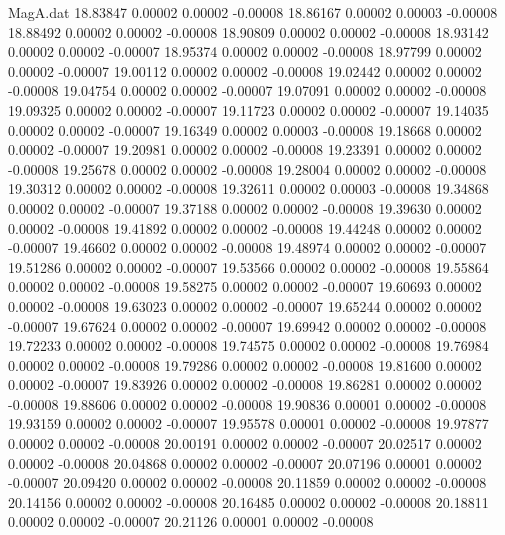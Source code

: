 \begin{filecontents}{MagA.dat}
  18.83847    0.00002    0.00002   -0.00008
  18.86167    0.00002    0.00003   -0.00008
  18.88492    0.00002    0.00002   -0.00008
  18.90809    0.00002    0.00002   -0.00008
  18.93142    0.00002    0.00002   -0.00007
  18.95374    0.00002    0.00002   -0.00008
  18.97799    0.00002    0.00002   -0.00007
  19.00112    0.00002    0.00002   -0.00008
  19.02442    0.00002    0.00002   -0.00008
  19.04754    0.00002    0.00002   -0.00007
  19.07091    0.00002    0.00002   -0.00008
  19.09325    0.00002    0.00002   -0.00007
  19.11723    0.00002    0.00002   -0.00007
  19.14035    0.00002    0.00002   -0.00007
  19.16349    0.00002    0.00003   -0.00008
  19.18668    0.00002    0.00002   -0.00007
  19.20981    0.00002    0.00002   -0.00008
  19.23391    0.00002    0.00002   -0.00008
  19.25678    0.00002    0.00002   -0.00008
  19.28004    0.00002    0.00002   -0.00008
  19.30312    0.00002    0.00002   -0.00008
  19.32611    0.00002    0.00003   -0.00008
  19.34868    0.00002    0.00002   -0.00007
  19.37188    0.00002    0.00002   -0.00008
  19.39630    0.00002    0.00002   -0.00008
  19.41892    0.00002    0.00002   -0.00008
  19.44248    0.00002    0.00002   -0.00007
  19.46602    0.00002    0.00002   -0.00008
  19.48974    0.00002    0.00002   -0.00007
  19.51286    0.00002    0.00002   -0.00007
  19.53566    0.00002    0.00002   -0.00008
  19.55864    0.00002    0.00002   -0.00008
  19.58275    0.00002    0.00002   -0.00007
  19.60693    0.00002    0.00002   -0.00008
  19.63023    0.00002    0.00002   -0.00007
  19.65244    0.00002    0.00002   -0.00007
  19.67624    0.00002    0.00002   -0.00007
  19.69942    0.00002    0.00002   -0.00008
  19.72233    0.00002    0.00002   -0.00008
  19.74575    0.00002    0.00002   -0.00008
  19.76984    0.00002    0.00002   -0.00008
  19.79286    0.00002    0.00002   -0.00008
  19.81600    0.00002    0.00002   -0.00007
  19.83926    0.00002    0.00002   -0.00008
  19.86281    0.00002    0.00002   -0.00008
  19.88606    0.00002    0.00002   -0.00008
  19.90836    0.00001    0.00002   -0.00008
  19.93159    0.00002    0.00002   -0.00007
  19.95578    0.00001    0.00002   -0.00008
  19.97877    0.00002    0.00002   -0.00008
  20.00191    0.00002    0.00002   -0.00007
  20.02517    0.00002    0.00002   -0.00008
  20.04868    0.00002    0.00002   -0.00007
  20.07196    0.00001    0.00002   -0.00007
  20.09420    0.00002    0.00002   -0.00008
  20.11859    0.00002    0.00002   -0.00008
  20.14156    0.00002    0.00002   -0.00008
  20.16485    0.00002    0.00002   -0.00008
  20.18811    0.00002    0.00002   -0.00007
  20.21126    0.00001    0.00002   -0.00008

\end{filecontents}
